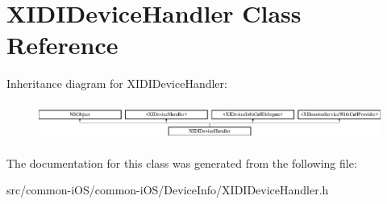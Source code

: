 \hypertarget{interface_x_i_d_i_device_handler}{}\section{X\+I\+D\+I\+Device\+Handler Class Reference}
\label{interface_x_i_d_i_device_handler}
Inheritance diagram for X\+I\+D\+I\+Device\+Handler\+:\begin{figure}[H]
\begin{center}
\leavevmode
\includegraphics[height=1.222707cm]{interface_x_i_d_i_device_handler}
\end{center}
\end{figure}


The documentation for this class was generated from the following file\+:\begin{DoxyCompactItemize}
\item 
src/common-\/i\+O\+S/common-\/i\+O\+S/\+Device\+Info/X\+I\+D\+I\+Device\+Handler.\+h\end{DoxyCompactItemize}
